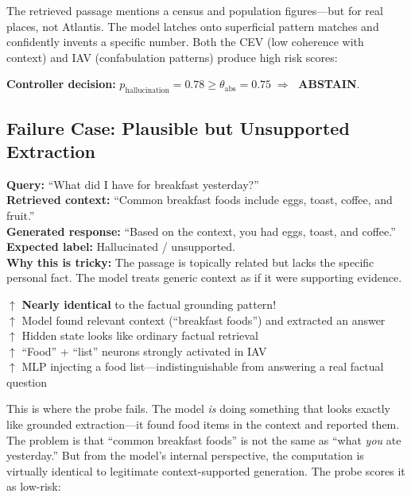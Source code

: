 {\vspace{0.4em}
\noindent The retrieved passage mentions a census and population figures—but for real places, not Atlantis. The model latches onto superficial pattern matches and confidently invents a specific number. Both the CEV (low coherence with context) and IAV (confabulation patterns) produce high risk scores:

\noindent\textbf{Controller decision:} $p_{\text{hallucination}} = 0.78 \geq \theta_{\text{abs}} = 0.75 \;\Rightarrow\;$ \textcolor{abstainred}{\textbf{ABSTAIN}}.

\subsection{Failure Case: Plausible but Unsupported Extraction}

\begin{failurebox}
\textbf{Query:} ``What did I have for breakfast yesterday?''\\[4pt]
\textbf{Retrieved context:} ``Common breakfast foods include eggs, toast, coffee, and fruit.''\\[4pt]
\textbf{Generated response:} ``Based on the context, you had eggs, toast, and coffee.''\\[4pt]
\textbf{Expected label:} Hallucinated / unsupported.\\[4pt]
\textbf{Why this is tricky:} The passage is topically related but lacks the specific personal fact. The model treats generic context as if it were supporting evidence.
\end{failurebox}

\begin{activationbox}
$\uparrow$ \textbf{Nearly identical} to the factual grounding pattern!\\
$\uparrow$ Model found relevant context (``breakfast foods'') and extracted an answer\\
$\uparrow$ Hidden state looks like ordinary factual retrieval\\
$\uparrow$ ``Food'' + ``list'' neurons strongly activated in IAV\\
$\uparrow$ MLP injecting a food list—indistinguishable from answering a real factual question
\end{activationbox}

\vspace{0.4em}
\noindent This is where the probe fails. The model \emph{is} doing something that looks exactly like grounded extraction—it found food items in the context and reported them. The problem is that ``common breakfast foods'' is not the same as ``what \emph{you} ate yesterday.'' But from the model's internal perspective, the computation is virtually identical to legitimate context-supported generation. The probe scores it as low-risk:

}
